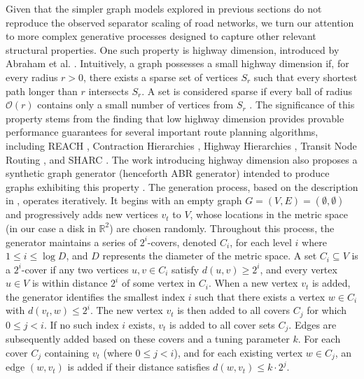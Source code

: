 Given that the simpler graph models explored in previous sections do not reproduce the observed  separator scaling of road networks, we turn our attention to more complex generative processes designed to capture other relevant structural properties.
One such property is highway dimension, introduced by Abraham et al. \cite{abraham_highway_2010}.
Intuitively, a graph possesses a small highway dimension if, for every radius \(r > 0\), there exists a sparse set of vertices \(S_r\) such that every shortest path longer than \(r\) intersects \(S_r\).
A set is considered sparse if every ball of radius \(\mathcal{O}(r)\) contains only a small number of vertices from \(S_r\) \cite{abraham_highway_2010}.
The significance of this property stems from the finding that low highway dimension provides provable performance guarantees for several important route planning algorithms, including REACH \cite{goldberg_reach_2006}, Contraction Hierarchies \cite{geisberger_contraction_2008}, Highway Hierarchies \cite{sanders_highway_2005}, Transit Node Routing \cite{bast_fast_2007}, and SHARC \cite{bauer_sharc_2010}.
The work introducing highway dimension also proposes a synthetic graph generator (henceforth ABR generator) intended to produce graphs exhibiting this property \cite{abraham_highway_2010}.
The generation process, based on the description in \cite{hutchison_synthetic_2010}, operates iteratively.
It begins with an empty graph \( G = (V, E) = (\emptyset, \emptyset) \) and progressively adds new vertices \(v_t\) to \(V\), whose locations in the metric space (in our case a disk in \(\mathbb{R}^2\)) are chosen randomly.
Throughout this process, the generator maintains a series of \(2^i\)-covers, denoted \(C_i\), for each level \(i\) where \(1 \leq i \leq \log D\), and \(D\) represents the diameter of the metric space.
A set \(C_i \subseteq V\) is a \(2^i\)-cover if any two vertices \(u, v \in C_i\) satisfy \(d(u, v) \geq 2^i\), and every vertex \(u \in V\) is within distance \(2^i\) of some vertex in \(C_i\).
When a new vertex \(v_t\) is added, the generator identifies the smallest index \(i\) such that there exists a vertex \(w \in C_i\) with \(d(v_t, w) \leq 2^i\).
The new vertex \(v_t\) is then added to all covers \(C_j\) for which \(0 \leq j < i\).
If no such index \(i\) exists, \(v_t\) is added to all cover sets \(C_j\).
Edges are subsequently added based on these covers and a tuning parameter \(k\).
For each cover \(C_j\) containing \(v_t\) (where \(0 \leq j < i\)), and for each existing vertex \(w \in C_j\), an edge \((w, v_t)\) is added if their distance satisfies \(d(w, v_t) \leq k \cdot 2^j\).
